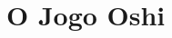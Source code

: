 \documentclass[a4paper]{article}
\begin{document}
%
%
%
%
%
%
%


\section{O Jogo Oshi}
\end{document}
